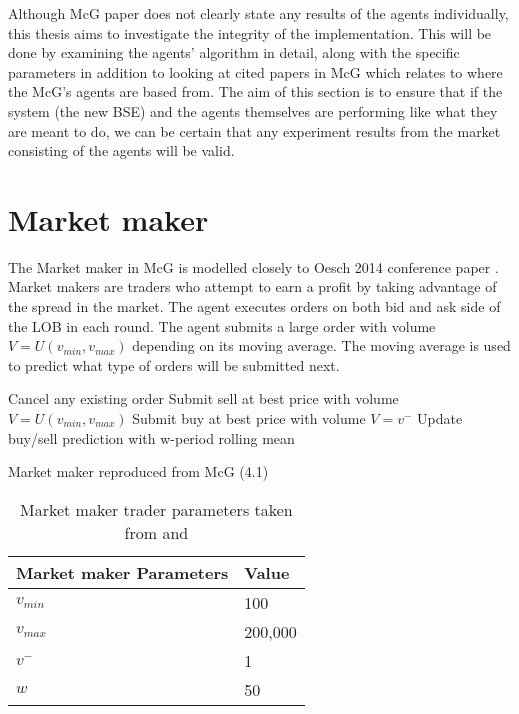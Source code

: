 Although McG paper does not clearly state any results of the agents individually, this thesis aims to investigate the integrity of the implementation. This will be done by examining the agents' algorithm in detail, along with the specific parameters in addition to looking at cited papers in McG which relates to where the McG's agents are based from. The aim of this section is to ensure that if the system (the new BSE) and the agents themselves are performing like what they are meant to do, we can be certain that any experiment results from the market consisting of the agents will be valid. 


\section{Market maker}
The Market maker in McG is modelled closely to Oesch 2014 conference paper \cite{Oesch}. Market makers are traders who attempt to earn a profit by taking advantage of the spread in the market. The agent executes orders on both bid and ask side of the LOB in each round. The agent submits a large order with volume $V=U(v_{min},v_{max})$ depending on its moving average. The moving average is used to predict what type of orders will be submitted next. 

\begin{algorithm}[H]
\DontPrintSemicolon 
{} {
    Cancel any existing order\;
     {
    Submit sell at best price with volume $V=U(v_{min},v_{max})$\;
    Submit buy at best price with volume $V=v^{-}$\;
    }
    \EndIf
  }
\EndIf
Update buy/sell prediction with w-period rolling mean\; 
\caption{{\sc Market maker reproduced from McG (4.1) \cite{McGroarty}} }
\label{algo:market_maker}
\end{algorithm}

\begin{table}[h]
\centering
\begin{tabular}{ |m||p{4cm}|} 
\hline
\textbf{Market maker Parameters}& \textbf{Value} \\
\hline
\hline
$v_{min}$ & 100 \\ 
\hline
$v_{max}$ & 200,000\\ 
\hline
$v^-$ & 1\\ 
\hline
$w$ & 50\\
\hline
\end{tabular}
\caption{Market maker trader parameters taken from \cite{McGroarty} and  \cite{Oesch}} 
\end{table}
\FloatBarrier 

